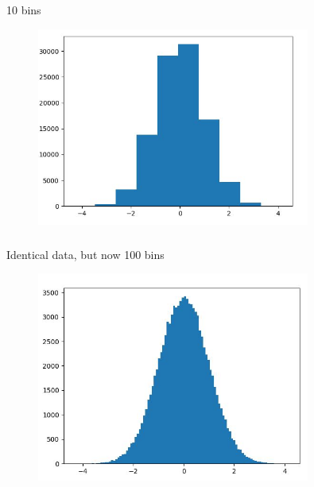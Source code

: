 \documentclass[english,14pt]{beamer}
\begin{document}
\begin{frame}[fragile]

\frametitle{}

10 bins
\begin{figure}[ht]
	\centering
	\includegraphics[width=0.8\textwidth]{figures/hist10BinsExample}
\end{figure}

\end{frame}


\begin{frame}[fragile]

\frametitle{}

Identical data, but now 100 bins

\begin{figure}[ht]
	\centering
	\includegraphics[width=0.8\textwidth]{figures/hist100BinsExample}
\end{figure}

\end{frame}
\end{document}

